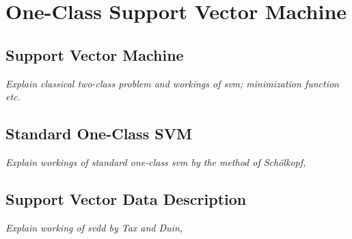 \section{One-Class Support Vector Machine}\label{sec:one_class_svm}

\subsection{Support Vector Machine}
\emph{Explain classical two-class problem and workings of \gls{svm}; minimization function etc.}

\subsection{Standard One-Class SVM}
\emph{Explain workings of standard one-class svm by the method of Sch\"olkopf, \cite{scholkopf1999support}}

\subsection{Support Vector Data Description}
\emph{Explain working of \gls{svdd} by Tax and Duin, \cite{tax2004support}}